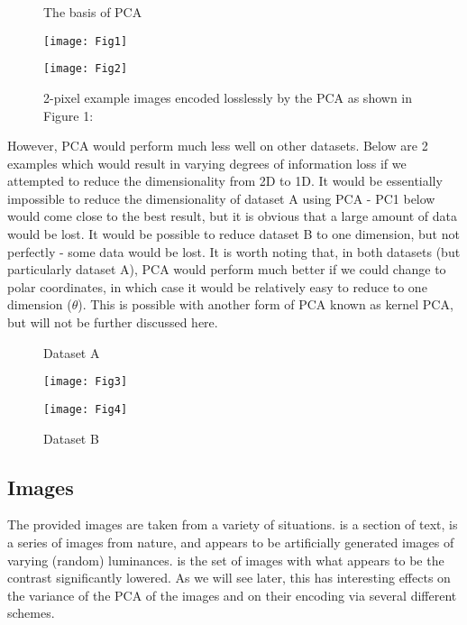 \documentclass[12pt]{article}
\begin{document}
\begin{figure}[h!]
    \centering
    \begin{minipage}{0.5\textwidth}
        \centering
        \caption{The basis of PCA}
        \texttt{[image: Fig1]} %
    \end{minipage}\hfill
    \begin{minipage}{0.5\textwidth}
        \centering
        \caption{2-pixel example images encoded losslessly by the PCA as shown in Figure 1:}
        \texttt{[image: Fig2]} %
    \end{minipage}
\end{figure}

However, PCA would perform much less well on other datasets. Below are 2 examples which would result in varying degrees of information loss if we attempted to reduce the dimensionality from 2D to 1D. It would be essentially impossible to reduce the dimensionality of dataset A using PCA - PC1 below would come close to the best result, but it is obvious that a large amount of data would be lost. It would be possible to reduce dataset B to one dimension, but not perfectly - some data would be lost. It is worth noting that, in both datasets (but particularly dataset A), PCA would perform much better if we could change to polar coordinates, in which case it would be relatively easy to reduce to one dimension ($\theta$). This is possible with another form of PCA known as kernel PCA, but will not be further discussed here.

\begin{figure}[h!]
    \centering
    \begin{minipage}{0.5\textwidth}
        \centering
        \caption{Dataset A}
        \texttt{[image: Fig3]}
    \end{minipage}\hfill
    \begin{minipage}{0.5\textwidth}
        \centering
        \caption{Dataset B}
        \texttt{[image: Fig4]}
    \end{minipage}
\end{figure}

\subsection{Images}
The provided images are taken from a variety of situations. {\selectfont{I1}} is a section of text, {\selectfont{I2}} is a series of images from nature, and {\selectfont{I3}} appears to be artificially generated images of varying (random) luminances. {\selectfont{I2w}} is the set of images {\selectfont{I2}} with what appears to be the contrast significantly lowered. As we will see later, this has interesting effects on the variance of the PCA of the images and on their encoding via several different schemes.
\end{document}
